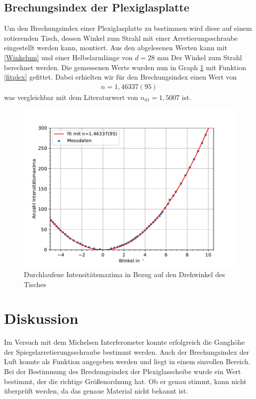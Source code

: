 \documentclass[11pt, a4paper]{article}
\begin{document}
    \subsection{Brechungsindex der Plexiglasplatte}
    Um den Brechungsindex einer Plexiglasplatte zu bestimmen wird diese auf einem rotierenden Tisch, dessen Winkel zum Strahl mit einer Arretierungsschraube eingestellt werden kann, montiert.
    Aus den abgelesenen Werten kann mit \ref{Winkelum} und einer Helbelarmlänge von $d = 28$ mm Der Winkel zum Strahl berechnet werden.
    Die gemessenen Werte wurden nun in Graph \ref{fig:plexiplot} mit Funktion \ref{fitplex} gefittet. Dabei erhielten wir für den Brechungsindex einen Wert von
    \begin{align}
        n = 1,46337(95)
    \end{align}
    was vergleichbar mit dem Literaturwert von $n_{lit} = 1,5007$ \cite[Siehe:]{refdat} ist.
    \begin{figure}[!h]
        \centering
        \includegraphics[width=\textwidth]{./plots/plexi.pdf}

        \caption{Durchlaufene Intensitätsmaxima in Bezug auf den Drehwinkel des Tisches}
        \label{fig:plexiplot}
    \end{figure}

    \section{Diskussion}
    Im Versuch mit dem Michelsen Interferometer konnte erfolgreich die Ganghöhe der Spiegelarretierungsschraube bestimmt werden.
    Auch der Brechungsindex der Luft konnte als Funktion angegeben werden und liegt in einem sinvollen Bereich.
    Bei der Bestimmung des Brechungsindex der Plexiglasscheibe wurde ein Wert bestimmt, der die richtige Größenordnung hat. Ob er genau stimmt, kann nicht überprüft werden, da das genaue Material nicht bekannt ist.
    
    
\end{document}
